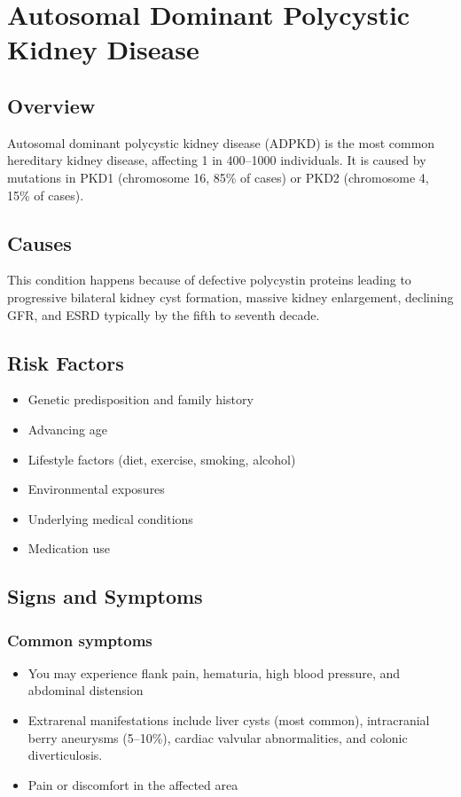 \chapter{Autosomal Dominant Polycystic Kidney Disease}
\label{sec:Autosomal Dominant Polycystic Kidney Disease}

\section{Overview}
Autosomal dominant polycystic kidney disease (ADPKD) is the most common hereditary kidney disease, affecting 1 in 400--1000 individuals. It is caused by mutations in PKD1 (chromosome 16, 85\% of cases) or PKD2 (chromosome 4, 15\% of cases).
\section{Causes}
This condition happens because of defective polycystin proteins leading to progressive bilateral kidney cyst formation, massive kidney enlargement, declining GFR, and ESRD typically by the fifth to seventh decade.     
\section{Risk Factors}

\begin{itemize}[noitemsep]
  \item Genetic predisposition and family history
  \item Advancing age
  \item Lifestyle factors (diet, exercise, smoking, alcohol)
  \item Environmental exposures
  \item Underlying medical conditions
  \item Medication use
\end{itemize}
\section{Signs and Symptoms}

\subsection{Common symptoms}
\begin{itemize}[noitemsep]
  \item You may experience flank pain, hematuria, high blood pressure, and abdominal distension
  \item Extrarenal manifestations include liver cysts (most common), intracranial berry aneurysms (5--10\%), cardiac valvular abnormalities, and colonic diverticulosis.
  \item Pain or discomfort in the affected area
  \end{itemize}

